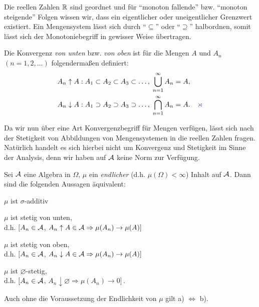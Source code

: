 Die reellen Zahlen $\R$ sind geordnet und für ``monoton
fallende'' bzw. ``monoton steigende'' Folgen wissen wir, dass ein eigentlicher
oder uneigentlicher Grenzwert existiert. Ein Mengensystem lässt sich durch
``$\subseteq$'' oder ``$\supseteq$'' halbordnen, somit lässt sich der
Monotoniebegriff in gewisser Weise übertragen.

\begin{defnn}
Die Konvergenz \emph{von unten} bzw. \emph{von oben} ist für die Mengen $A$ und
$A_{n}$ $(n=1,2,\ldots )$ folgendermaßen definiert:
\begin{align*}
&A_{n}\uparrow A:A_{1} \subset A_{2} \subset A_{3} \subset \ldots , \;
\bigcup^{\infty}_{n=1} A_{n} = A,\\
&A_{n} \downarrow A: A_{1} \supset A_{2} \supset A_{3} \supset \ldots ,\;
\bigcap^{\infty}_{n=1} A_{n} = A.\fishhere
\end{align*}
\end{defnn}

Da wir nun über eine Art Konvergenzbegriff für Mengen verfügen, lässt sich nach
der Stetigkeit von Abbildungen von Mengensystemen in die reellen Zahlen fragen.
Natürlich handelt es sich hierbei nicht um Konvergenz und Stetigkeit im Sinne
der Analysis, denn wir haben auf $\AA$ keine Norm zur Verfügung.

\begin{prop}
\label{prop:1.2}
Sei $\AA$ eine Algebra in $\Omega $, $\mu$ ein \textit{endlicher} (d.h. $\mu
(\Omega) < \infty $) Inhalt auf $\AA$.  Dann sind die folgenden Aussagen
äquivalent:
\begin{propenum}
\item
\label{prop:1.2:1}
$\mu$ ist $\sigma $-additiv
\item
\label{prop:1.2:2}
$\mu$ ist stetig von unten,\\
d.h. $[A_{n} \in \AA$, $A_{n} \uparrow A \in \AA \Rightarrow
\mu (A_{n}) \to \mu (A) ]$
\item
\label{prop:1.2:3}
$\mu $ ist stetig von oben, \\
d.h. $[A_{n} \in \AA$, $ A_{n} \downarrow A \in \AA \Rightarrow
\mu (A_{n}) \to \mu (A) ] $
\item
\label{prop:1.2:4}
$\mu$ ist $\varnothing$-stetig, \\
d.h. $[A_{n} \in \AA$, $ A_{n} \downarrow \varnothing \Rightarrow
\mu (A_{n} )\to 0]\, .$
\end{propenum}
Auch ohne die Voraussetzung der Endlichkeit von $\mu $ gilt a)
$\Longleftrightarrow $ b).\fishhere
\end{prop}


